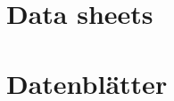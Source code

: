 \cleardoublepage
\ifdocenglish
    \chapter{Data sheets}
\else
    \chapter{Datenblätter}
\fi

\label{app:Datenblätter}


